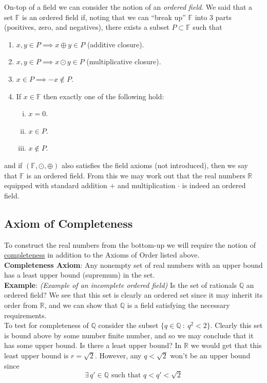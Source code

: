 \documentclass[12pt]{article}
\newlength\tindent
\renewcommand{\indent}{\hspace*{\tindent}}
\newcommand{\R}{\mathbb R}
\newcommand{\Q}{\mathbb Q}
\newcommand{\F}{\mathbb F}
\begin{document}
\indent On-top of a field we can consider the notion of an {\em ordered field}. We said that a set $\F$ is an ordered field if, noting that we can ``break up'' $\F$ into 3 parts (positives, zero, and negatives), there exists a subset $P \subset \F$ such that
\begin{enumerate}[(1)]
	\item $x, y \in P \implies x \oplus y \in P$ (additive closure).
	\item $x, y \in P \implies x \odot y \in P$ (multiplicative closure).
	\item $x \in P \implies -x \notin P$.
	\item If $x \in \F$ then exactly one of the following hold:
	\begin{enumerate}[(i)]
		\item $x = 0$.
		\item $x \in P$.
		\item $x \notin P$.
	\end{enumerate}
\end{enumerate}

and if $(\F, \odot, \oplus)$ also satisfies the field axioms (not introduced), then we say that $\F$ is an ordered field. From this we may work out that the real numbers $\R$ equipped with standard addition $+$ and multiplication $\cdot$ is indeed an ordered field.

\subsection{Axiom of Completeness}

\indent To construct the real numbers from the bottom-up we will require the notion of \underline{completeness} in addition to the Axioms of Order listed above. \\

%
%
{\bf Completeness Axiom}: Any nonempty set of real numbers with an upper bound has a least upper bound (supremum) in the set. \\

%
%
{\bf Example}: {\em (Example of an incomplete ordered field)} Is the set of rationals $\Q$ an ordered field? We see that this set is clearly an ordered set since it may inherit its order from $\R$, and we can show that $\Q$ is a field satisfying the necessary requirements. \\

\indent To test for completeness of $\Q$ consider the subset $\{q \in \Q~:~q^2 < 2\}$. Clearly this set is bound above by some number finite number, and so we may conclude that it has some upper bound. Is there a least upper bound? In $\R$ we would get that this least upper bound is $r = \sqrt{2}$. However, any $q < \sqrt{2}$ won't be an upper bound since
\begin{equation*}
	\exists\,q' \in \Q \text{ such that } q < q' < \sqrt{2}
\end{equation*}
\end{document}
